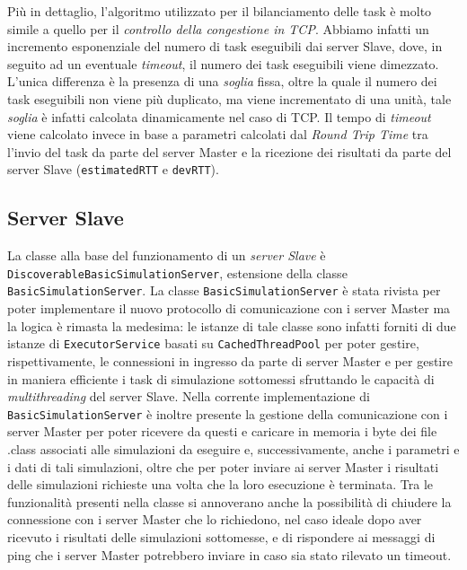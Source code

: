 Più in dettaglio, l'algoritmo utilizzato per il bilanciamento delle task è molto simile a quello per il \emph{controllo della congestione in TCP}. Abbiamo infatti un incremento esponenziale del numero di task eseguibili dai server Slave, dove, in seguito ad un eventuale \emph{timeout}, il numero dei task eseguibili viene dimezzato. L'unica differenza è la presenza di una \emph{soglia} fissa, oltre la quale il numero dei task eseguibili non viene più duplicato, ma viene incrementato di una unità, tale \emph{soglia} è infatti calcolata dinamicamente nel caso di TCP. Il tempo di \emph{timeout} viene calcolato invece in base a parametri calcolati dal \emph{Round Trip Time} tra l'invio del task da parte del server Master e la ricezione dei risultati da parte del server Slave (\texttt{estimatedRTT} e \texttt{devRTT}).

\subsection{Server Slave}
La classe alla base del funzionamento di un \emph{server Slave} è \texttt{DiscoverableBasicSimulationServer}, estensione della classe \texttt{BasicSimulationServer}.
La classe \texttt{BasicSimulationServer} è stata rivista per poter implementare il nuovo protocollo di comunicazione con i server Master ma la logica è rimasta la medesima:
le istanze di tale classe sono infatti forniti di due istanze di \texttt{ExecutorService} basati su \texttt{CachedThreadPool} per poter gestire, rispettivamente, le connessioni in ingresso da parte di server Master
e per gestire in maniera efficiente i task di simulazione sottomessi sfruttando le capacità di \emph{multithreading} del server Slave.
Nella corrente implementazione di \texttt{BasicSimulationServer} è inoltre presente la gestione della comunicazione con i server Master per poter ricevere da questi e caricare in memoria i byte dei file .class associati
alle simulazioni da eseguire e, successivamente, anche i parametri e i dati di tali simulazioni, oltre che per poter inviare ai server Master i risultati delle simulazioni richieste una volta che la loro esecuzione è terminata.
Tra le funzionalità presenti nella classe si annoverano anche la possibilità di chiudere la connessione con i server Master che lo richiedono, nel caso ideale dopo aver ricevuto i risultati delle simulazioni sottomesse,
e di rispondere ai messaggi di ping che i server Master potrebbero inviare in caso sia stato rilevato un timeout. 

